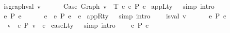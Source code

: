 \begin{isabellebody}
\ \ \ \ {\isachardoublequoteopen}is{\isacharunderscore}{\kern0pt}graph{\isacharunderscore}{\kern0pt}val\ v\ {\isacharequal}{\kern0pt}{\isacharequal}{\kern0pt}{\isachargreater}{\kern0pt}\isanewline
\ \ \ \ \ Case\ {\isacharparenleft}{\kern0pt}Graph\ v{\isacharparenright}{\kern0pt}\ {\isasymGamma}\ T\ e{}\ e{}\ {\isacharminus}{\kern0pt}{\isachargreater}{\kern0pt}{\isacharbraceleft}{\kern0pt}P{\isacharbraceright}{\kern0pt}\ e{}{\isachardoublequoteclose}\isanewline
{\isacharbar}{\kern0pt}\ appL{\isacharunderscore}{\kern0pt}ty\ \ \ {\isacharbrackleft}{\kern0pt}simp{\isacharcomma}{\kern0pt}\ intro{\isacharbrackright}{\kern0pt}{\isacharcolon}{\kern0pt}\isanewline
\ \ \ \ {\isachardoublequoteopen}e{}\ {\isacharminus}{\kern0pt}{\isachargreater}{\kern0pt}{\isacharbraceleft}{\kern0pt}P{\isacharbraceright}{\kern0pt}\ e{}{\isacharprime}{\kern0pt}\ {\isacharequal}{\kern0pt}{\isacharequal}{\kern0pt}{\isachargreater}{\kern0pt}\isanewline
\ \ \ \ \ e{}\ {\isasymcdot}\ e{}\ {\isacharminus}{\kern0pt}{\isachargreater}{\kern0pt}{\isacharbraceleft}{\kern0pt}P{\isacharbraceright}{\kern0pt}\ e{}{\isacharprime}{\kern0pt}\ {\isasymcdot}\ e{}{\isachardoublequoteclose}\isanewline
{\isacharbar}{\kern0pt}\ appR{\isacharunderscore}{\kern0pt}ty\ \ \ {\isacharbrackleft}{\kern0pt}simp{\isacharcomma}{\kern0pt}\ intro{\isacharbrackright}{\kern0pt}{\isacharcolon}{\kern0pt}\isanewline
\ \ \ \ {\isachardoublequoteopen}is{\isacharunderscore}{\kern0pt}val\ v\ {\isacharequal}{\kern0pt}{\isacharequal}{\kern0pt}{\isachargreater}{\kern0pt}\isanewline
\ \ \ \ \ e\ {\isacharminus}{\kern0pt}{\isachargreater}{\kern0pt}{\isacharbraceleft}{\kern0pt}P{\isacharbraceright}{\kern0pt}\ e{\isacharprime}{\kern0pt}\ {\isacharequal}{\kern0pt}{\isacharequal}{\kern0pt}{\isachargreater}{\kern0pt}\isanewline
\ \ \ \ \ v\ {\isasymcdot}\ e\ {\isacharminus}{\kern0pt}{\isachargreater}{\kern0pt}{\isacharbraceleft}{\kern0pt}P{\isacharbraceright}{\kern0pt}\ v\ {\isasymcdot}\ e{\isacharprime}{\kern0pt}{\isachardoublequoteclose}\isanewline
{\isacharbar}{\kern0pt}\ caseL{\isacharunderscore}{\kern0pt}ty\ \ \ {\isacharbrackleft}{\kern0pt}simp{\isacharcomma}{\kern0pt}\ intro{\isacharbrackright}{\kern0pt}{\isacharcolon}{\kern0pt}\isanewline
\ \ \ \ {\isachardoublequoteopen}e{}\ {\isacharminus}{\kern0pt}{\isachargreater}{\kern0pt}{\isacharbraceleft}{\kern0pt}P{\isacharbraceright}{\kern0pt}\ e{}{\isacharprime}{\kern0pt}\ {\isacharequal}{\kern0pt}{\isacharequal}{\kern0pt}{\isachargreater}{\kern0pt}\isanewline

\end{isabellebody}
